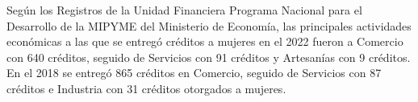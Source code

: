 Según los Registros de la Unidad Financiera Programa Nacional para el Desarrollo de la MIPYME del Ministerio de Economía, las principales actividades económicas a las que se entregó créditos a mujeres en el 2022 fueron a Comercio con 640 créditos, seguido de Servicios con 91 créditos y Artesanías con 9 créditos. En el 2018 se entregó 865 créditos en Comercio, seguido de Servicios con 87 créditos e Industria con 31 créditos otorgados a mujeres. 